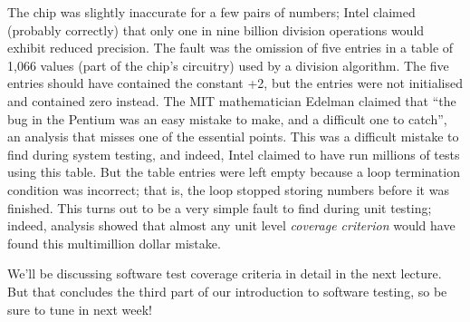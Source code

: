 The chip was slightly inaccurate for a few pairs of numbers; Intel claimed
(probably correctly) that only one in nine billion division operations would
exhibit reduced precision. The fault was the omission of five entries in a table
of 1,066 values (part of the chip's circuitry) used by a division algorithm. The
five entries should have contained the constant +2, but the entries were not
initialised and contained zero instead. The MIT mathematician Edelman claimed
that ``the bug in the Pentium was an easy mistake to make, and a difficult one
to catch'', an analysis that misses one of the essential points. This was a
difficult mistake to find during system testing, and indeed, Intel claimed to
have run millions of tests using this table. But the table entries were left
empty because a loop termination condition was incorrect; that is, the loop
stopped storing numbers before it was finished. This turns out to be a very
simple fault to find during unit testing; indeed, analysis showed that almost
any unit level {\it coverage criterion} would have found this multimillion dollar
mistake. 


We'll be discussing software test coverage criteria in detail in the next
lecture.
%
But that concludes the third part of our introduction to software testing, so
be sure to tune in next week!

